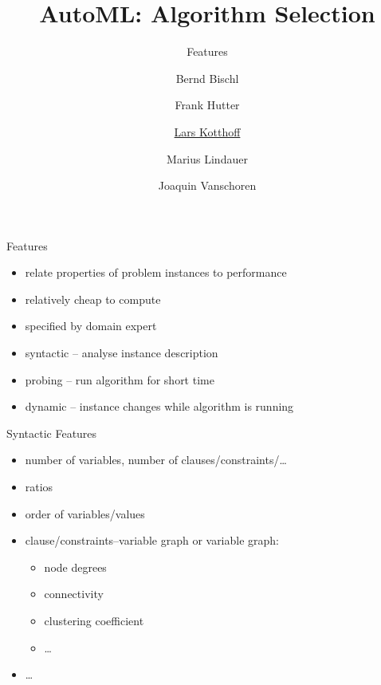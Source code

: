 



\title[AutoML: Overview]{AutoML: Algorithm Selection} %
\subtitle{Features} %
\author[Marius Lindauer]{Bernd Bischl \and Frank Hutter \and \underline{Lars Kotthoff}\newline \and Marius Lindauer \and Joaquin Vanschoren}
\institute{}
\date{}




	
	\maketitle
	

\begin{frame}{Features}
\begin{itemize}
\item relate properties of problem instances to performance
\item relatively cheap to compute
\item specified by domain expert
\item syntactic -- analyse instance description
\item probing -- run algorithm for short time
\item dynamic -- instance changes while algorithm is running
\end{itemize}
\end{frame}

\begin{frame}{Syntactic Features}
\begin{itemize}
\item number of variables, number of clauses/constraints/\ldots
\item ratios
\item order of variables/values
\item clause/constraints--variable graph or variable graph:
    \begin{itemize}
    \item node degrees
    \item connectivity
    \item clustering coefficient
    \item \ldots
    \end{itemize}
\item \ldots
\end{itemize}
\end{frame}

